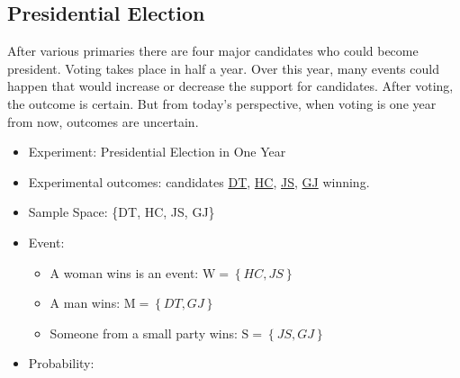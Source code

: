 \documentclass[
]{book}
\providecommand{\tightlist}{%
  \setlength{\itemsep}{0pt}\setlength{\parskip}{0pt}}
\begin{document}
\hypertarget{presidential-election}{%
\subsection{Presidential Election}\label{presidential-election}}

After various primaries there are four major candidates who could become president. Voting takes place in half a year. Over this year, many events could happen that would increase or decrease the support for candidates. After voting, the outcome is certain. But from today's perspective, when voting is one year from now, outcomes are uncertain.

\begin{itemize}
\tightlist
\item
  Experiment: Presidential Election in One Year
\item
  Experimental outcomes: candidates \href{https://en.wikipedia.org/wiki/Donald_Trump}{DT}, \href{https://en.wikipedia.org/wiki/Hillary_Clinton}{HC}, \href{https://en.wikipedia.org/wiki/Jill_Stein}{JS}, \href{https://en.wikipedia.org/wiki/Gary_Johnson}{GJ} winning.
\item
  Sample Space: \{DT, HC, JS, GJ\}
\item
  Event:

  \begin{itemize}
  \tightlist
  \item
    A woman wins is an event: \(\text{W} = \left\{HC, JS\right\}\)
  \item
    A man wins: \(\text{M} = \left\{DT, GJ\right\}\)
  \item
    Someone from a small party wins: \(\text{S} = \left\{JS, GJ\right\}\)
  \end{itemize}
\item
  Probability:


\end{itemize}
\end{document}
